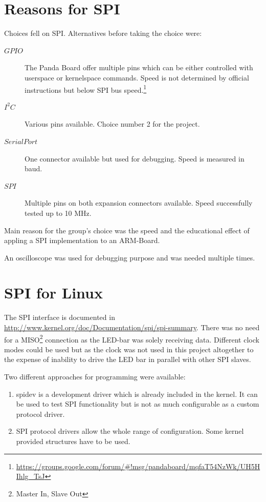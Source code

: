 \section{Reasons for SPI}

Choices fell on SPI. Alternatives before taking the choice were:

\begin{description}
\item[\(GPIO\)] The Panda Board offer multiple pins which can be either controlled with userspace or kernelspace commands. Speed is not determined by official 
instructions but below SPI bus speed.\footnote{\url{https://groups.google.com/forum/\#!msg/pandaboard/mqfaT54NzWk/UH5HIhlg\_TsJ}}
\item[\(I^2C\)] Various pins available. Choice number 2 for the project.
\item[\(Serial Port\)] One connector available but used for debugging. Speed is measured in baud.
\item[\(SPI\)] Multiple pins on both expansion connectors available. Speed successfully tested up to 10 MHz.
\end{description}

Main reason for the group's choice was the speed and the educational effect of appling a SPI implementation to an ARM-Board.

An oscilloscope was used for debugging purpose and was needed multiple times.

\section{SPI for Linux}

The SPI interface is documented in \url{http://www.kernel.org/doc/Documentation/spi/spi-summary}. There was no need for a MISO\footnote{Master In, Slave Out} connection as the LED-bar was solely receiving data.
Different clock modes could be used but as the clock was not used in this project altogether to the expense of inability to drive the LED bar in parallel with other SPI slaves.

Two different approaches for programming were available:
\begin{enumerate}
\item spidev is a development driver which is already included in the kernel. It can be used to test SPI functionality but is not as much configurable as a custom protocol driver.
\item SPI protocol drivers allow the whole range of configuration. Some kernel provided structures have to be used.
\end{enumerate}


